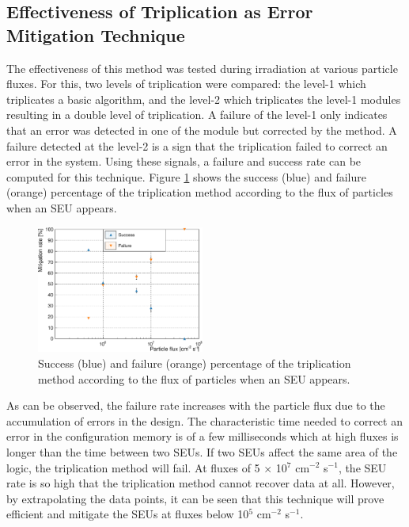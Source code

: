     \subsection{Effectiveness of Triplication as Error Mitigation Technique}

      The effectiveness of this method was tested during irradiation at various particle fluxes. For this, two levels of triplication were compared: the level-1 which triplicates a basic algorithm, and the level-2 which triplicates the level-1 modules resulting in a double level of triplication. A failure of the level-1 only indicates that an error was detected in one of the module but corrected by the method. A failure detected at the level-2 is a sign that the triplication failed to correct an error in the system. Using these signals, a failure and success rate can be computed for this technique. Figure \ref{fig:II-5-data-triplication} shows the success (blue) and failure (orange) percentage of the triplication method according to the flux of particles when an SEU appears. \\

      \begin{figure}[h!]
        \centering
        \includegraphics[width=0.49\textwidth]{img/plots/c_l-crop}
        \caption{Success (blue) and failure (orange) percentage of the triplication method according to the flux of particles when an SEU appears.}
        \label{fig:II-5-data-triplication}
      \end{figure}

      As can be observed, the failure rate increases with the particle flux due to the accumulation of errors in the design. The characteristic time needed to correct an error in the configuration memory is of a few milliseconds which at high fluxes is longer than the time between two SEUs. If two SEUs affect the same area of the logic, the triplication method will fail. At fluxes of 5 $ \times $ 10$^7$ cm$^{-2}$ s$^{-1}$, the SEU rate is so high that the triplication method cannot recover data at all. However, by extrapolating the data points, it can be seen that this technique will prove efficient and mitigate the SEUs at fluxes below 10$^5$ cm$^{-2}$ s$^{-1}$.

